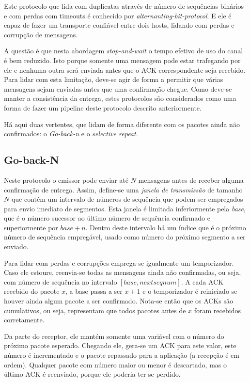 Este protocolo que lida com duplicatas através de número de sequências binários e com perdas com timeouts é conhecido por \emph{alternanting-bit-protocol}.
E ele é capaz de fazer um transporte confiável entre dois hosts, lidando com perdas e corrupção de mensagens.

A questão é que nesta abordagem \emph{stop-and-wait} o tempo efetivo de uso do canal é bem reduzido.
Isto porque somente uma mensagem pode estar trafegando por ele e nenhuma outra será enviada antes que o ACK correspondente seja recebido.
Para lidar com esta limitação, deve-se agir de forma a permitir que várias mensagens sejam enviadas antes que uma confirmação chegue.
Como deve-se manter a consistência da entrega, estes protocolos são considerados como uma forma de fazer um pipeline deste protocolo descrito anteriormente.

Há aqui duas vertentes, que lidam de forma diferente com os pacotes ainda não confirmados: o \emph{Go-back-n} e o \emph{selective repeat}.

\subsection{Go-back-N}

Neste protocolo o emissor pode enviar até $N$ mensagens antes de receber alguma confirmação de entrega.
Assim, define-se uma \emph{janela de transmissão} de tamanho $N$ que contém um intervalo de números de sequência que podem ser empregados para envio imediato de segmentos.
Esta janela é limitada inferiormente pela \emph{base}, que é o número sucessor ao último número de sequência confirmado e superiormente por $base + n$.
Dentro deste intervalo há um índice que é o próximo número de sequência empregável, usado como número do próximo segmento a ser enviado.

Para lidar com perdas e corrupções emprega-se igualmente um temporizador.
Caso ele estoure, reenvia-se todas as mensagens ainda não confirmadas, ou seja, com número de sequência no intervalo $[base, nextseqnum]$.
A cada ACK recebido do pacote $x$, a base passa a ser $x+1$ e o temporizador é reiniciado se houver ainda algum pacote a ser confirmado. 
Nota-se então que os ACKs são cumulativos, ou seja, representam que todos pacotes antes de $x$ foram recebidos corretamente.

Da parte do receptor, ele mantém somente uma variável com o número do próximo pacote esperado.
Chegando ele, gera-se um ACK para este valor, este número é incrementado e o pacote repassado para a aplicação (a recepção é em ordem).
Qualquer pacote com número maior ou menor é descartado, mas o último ACK é reenviado, porque ele poderia ter se perdido.

